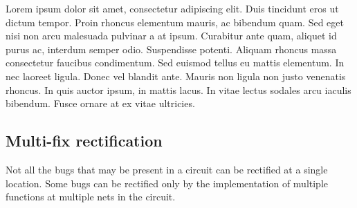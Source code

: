 \begin{Example}
Lorem ipsum dolor sit amet, consectetur adipiscing elit. Duis tincidunt eros ut dictum tempor. Proin rhoncus elementum mauris, ac bibendum quam. Sed eget nisi non arcu malesuada pulvinar a at ipsum. Curabitur ante quam, aliquet id purus ac, interdum semper odio. Suspendisse potenti. Aliquam rhoncus massa consectetur faucibus condimentum. Sed euismod tellus eu mattis elementum. In nec laoreet ligula. Donec vel blandit ante. Mauris non ligula non justo venenatis rhoncus. In quis auctor ipsum, in mattis lacus. In vitae lectus sodales arcu iaculis bibendum. Fusce ornare at ex vitae ultricies.
\end{Example}

\subsection{Multi-fix rectification}

Not all the bugs that may be present in a circuit can be rectified at a single location. Some bugs can be rectified only by the implementation of multiple functions at multiple nets in the circuit. 

